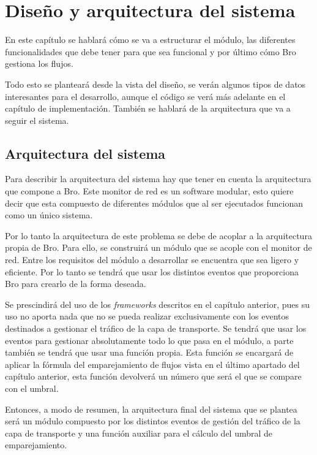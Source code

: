 \chapter{Diseño y arquitectura del sistema}

En este capítulo se hablará cómo se va a estructurar el módulo, las diferentes funcionalidades que debe tener 
para que sea funcional y por último cómo Bro gestiona los flujos.

\intro Todo esto se planteará desde la vista del diseño, se verán algunos tipos de datos interesantes para el 
desarrollo, aunque el código se verá más adelante en el capítulo de implementación. También se hablará de la 
arquitectura que va a seguir el sistema.

\section{Arquitectura del sistema}

Para describir la arquitectura del sistema hay que tener en cuenta la arquitectura que compone a Bro. Este monitor 
de red es un software modular, esto quiere decir que esta compuesto de diferentes módulos que al ser ejecutados 
funcionan como un único sistema.

\intro Por lo tanto la arquitectura de este problema se debe de acoplar a la arquitectura propia de Bro. Para ello, 
se construirá un módulo que se acople con el monitor de red. Entre los requisitos del módulo a desarrollar se 
encuentra que sea ligero y eficiente. Por lo tanto se tendrá que usar los distintos eventos que proporciona Bro 
para crearlo de la forma deseada.

\intro Se prescindirá del uso de los \textit{frameworks} descritos en el capítulo anterior, pues su uso no aporta 
nada que no se pueda realizar exclusivamente con los eventos destinados a gestionar el tráfico de la capa de 
transporte. Se tendrá que usar los eventos para gestionar absolutamente todo lo que pasa en el módulo, a parte 
también se tendrá que usar una función propia. Esta función se encargará de aplicar la fórmula del emparejamiento 
de flujos vista en el último apartado del capítulo anterior, esta función devolverá un número que será el que 
se compare con el umbral.

\intro Entonces, a modo de resumen, la arquitectura final del sistema que se plantea será un módulo 
compuesto por los distintos eventos de gestión del tráfico de la capa de transporte y una función auxiliar para 
el cálculo del umbral de emparejamiento. 

